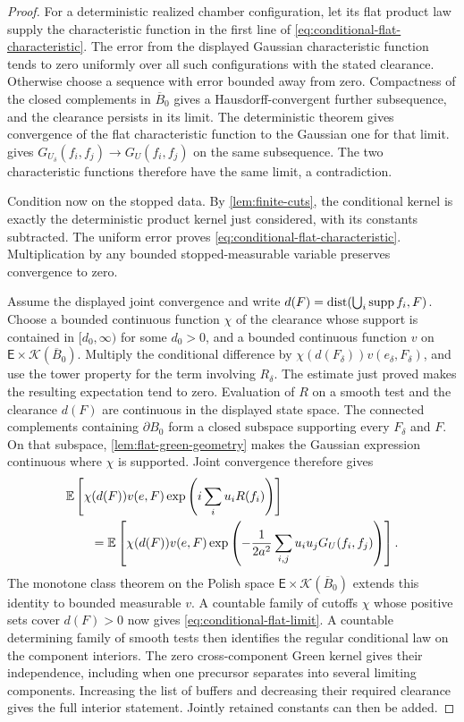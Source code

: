 \begin{proof}
For a deterministic realized chamber configuration, let its flat product
law supply the characteristic function in the first line of
\cref{eq:conditional-flat-characteristic}. The error from the displayed
Gaussian characteristic function tends to zero uniformly over all such
configurations with the stated clearance. Otherwise choose a sequence with
error bounded away from zero. Compactness of the closed complements in
\(\overline B_0\) gives a Hausdorff-convergent further subsequence, and the
clearance persists in its limit. The deterministic theorem gives convergence
of the flat characteristic function to the Gaussian one for that limit.
 gives
\(G_{U_\delta}(f_i,f_j)\to G_U(f_i,f_j)\) on the same subsequence.
The two characteristic functions therefore have the same limit, a
contradiction.

Condition now on the stopped data. By \cref{lem:finite-cuts}, the
conditional kernel is exactly the deterministic product kernel just
considered, with its constants subtracted. The uniform error proves
\cref{eq:conditional-flat-characteristic}. Multiplication by any bounded
stopped-measurable variable preserves convergence to zero.

Assume the displayed joint convergence and write
\(d(F)=\operatorname{dist}(\bigcup_i\operatorname{supp} f_i,F)\). Choose a bounded continuous function
\(\chi\) of the clearance whose support is contained in \([d_0,\infty)\)
for some \(d_0>0\), and a bounded continuous function
\(v\) on \(\mathsf E\times\mathcal K(\overline B_0)\).
Multiply the conditional difference by
\(\chi(d(F_\delta))v(e_\delta,F_\delta)\), and use the tower property for
the term involving \(R_\delta\). The estimate just proved makes the
resulting expectation tend to zero. Evaluation of \(R\) on a smooth test
and the clearance \(d(F)\) are continuous in the displayed state space.
The connected complements containing \(\partial B_0\) form a closed
subspace supporting every \(F_\delta\) and \(F\). On that subspace,
\cref{lem:flat-green-geometry} makes the Gaussian expression continuous
where \(\chi\) is supported. Joint convergence therefore gives
\begin{align*}
 &\mathbb E\left[\chi(d(F))v(e,F)
       \exp\left(i\sum_i u_iR(f_i)\right)\right]\\
 &\qquad=\mathbb E\left[\chi(d(F))v(e,F)
       \exp\left(-\frac1{2a^2}
                 \sum_{i,j}u_i u_jG_U(f_i,f_j)\right)\right].
\end{align*}
The monotone class theorem on the Polish space
\(\mathsf E\times\mathcal K(\overline B_0)\) extends this identity to
bounded measurable \(v\). A countable family of cutoffs \(\chi\) whose
positive sets cover \(d(F)>0\) now gives
\cref{eq:conditional-flat-limit}. A countable determining family of
smooth tests then identifies the regular conditional law on the component
interiors. The zero cross-component Green kernel gives their independence,
including when one precursor separates into several limiting components.
Increasing the list of buffers and decreasing their required clearance
gives the full interior statement. Jointly retained constants can then be
added.
\end{proof}
